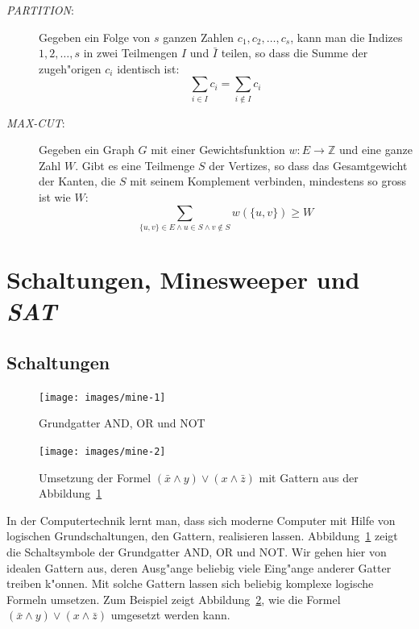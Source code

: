 \begin{description}
\[\]
\item[\textsl{PARTITION}:] Gegeben ein Folge von $s$ ganzen Zahlen
$c_1,c_2,\dots,c_s$, kann man die Indizes $1,2,\dots,s$ in zwei
Teilmengen $I$ und $\bar I$ teilen, so dass die Summe der zugeh"origen
$c_i$ identisch ist:
\[
\sum_{i\in I}c_i=\sum_{i\not\in I}c_i
\]
\item[\textsl{MAX-CUT}:] Gegeben ein Graph $G$ mit einer Gewichtsfunktion
$w\colon E\to\mathbb Z$ und eine ganze Zahl $W$. Gibt es eine Teilmenge
$S$ der Vertizes, so dass das Gesamtgewicht der Kanten, die $S$ mit
seinem Komplement verbinden, mindestens so gross ist wie $W$:
\[
\sum_{\{u,v\}\in E\wedge u\in S\wedge v\not\in S} w(\{u,v\})\ge W
\]
\end{description}

\section{Schaltungen, Minesweeper und \textsl{SAT}}
\subsection{Schaltungen}
\begin{figure}
\begin{center}
\texttt{[image: images/mine-1]}
\end{center}
\caption{Grundgatter AND, OR und NOT\label{gatter}}
\end{figure}%
\begin{figure}
\begin{center}
\texttt{[image: images/mine-2]}
\end{center}
\caption{Umsetzung der Formel
$(\bar x\wedge y)\vee(x\wedge \bar z)$ mit Gattern aus der
Abbildung~\ref{gatter}\label{gatterformel}}
\end{figure}%
In der Computertechnik lernt man, dass sich moderne Computer mit
Hilfe von logischen Grundschaltungen, den Gattern, realisieren lassen.
Abbildung~\ref{gatter} zeigt die Schaltsymbole der Grundgatter AND, OR
und NOT. Wir gehen hier von idealen Gattern aus, deren Ausg"ange beliebig
viele Eing"ange anderer Gatter treiben k"onnen. Mit solche Gattern
lassen sich beliebig komplexe logische Formeln umsetzen. Zum Beispiel
zeigt Abbildung~\ref{gatterformel}, wie die Formel
$(\bar x\wedge y)\vee(x\wedge \bar z)$ umgesetzt werden kann.

